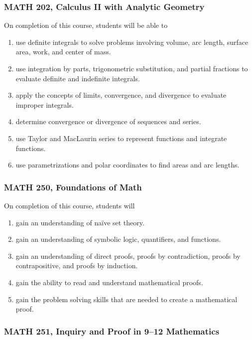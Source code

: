 \documentclass[11pt]{article}
\newenvironment{alphalist}{
\begin{enumerate}[label=(\arabic*),widest=107 ,leftmargin=25pt, itemsep=0pt]}
{\end{enumerate}}
\begin{document}
\subsubsection*{MATH 202, Calculus II with Analytic Geometry}

 On completion of this course, students will be able to
 \begin{alphalist}
    \item use definite integrals to solve problems involving volume, arc length, 
       surface area, work, and center of mass. 
    \item use integration by parts, trigonometric substitution, and partial fractions 
        to evaluate definite and indefinite integrals.
    \item apply the concepts of limits, convergence, and divergence to evaluate 
        improper integrals.
    \item determine convergence or divergence of sequences and series.
    \item use Taylor and MacLaurin series to represent functions and integrate 
        functions.
    \item use parametrizations and polar coordinates to find areas and arc lengths.
 \end{alphalist}

\subsubsection*{MATH 250, Foundations of Math}


On completion of this course, students will
\begin{alphalist}
    \item gain an understanding of na\"ive set theory. 
    \item gain an understanding of symbolic logic, quantifiers, and functions.
    \item gain an understanding of direct proofs, proofs by contradiction, proofs by contrapositive, and proofs by induction.
    \item gain the ability to read and understand mathematical proofs.
    \item gain the problem solving skills that are needed to create a mathematical proof.
\end{alphalist}

\subsubsection*{MATH 251, Inquiry and Proof in 9--12 Mathematics}
\end{document}
